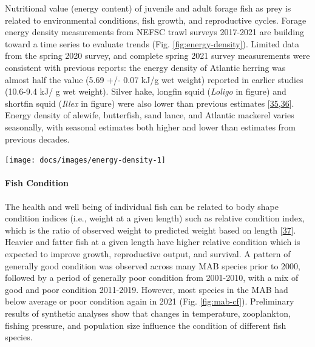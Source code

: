\documentclass[
  10pt,
]{article}
\let\origfigure\figure
\let\endorigfigure\endfigure
\renewenvironment{figure}[1][2] {
    \expandafter\origfigure\expandafter[H]
} {
    \endorigfigure
}
\begin{document}
Nutritional value (energy content) of juvenile and adult forage fish as
prey is related to environmental conditions, fish growth, and
reproductive cycles. Forage energy density measurements from NEFSC trawl
surveys 2017-2021 are building toward a time series to evaluate trends
(Fig. \ref{fig:energy-density}). Limited data from the spring 2020
survey, and complete spring 2021 survey measurements were consistent
with previous reports: the energy density of Atlantic herring was almost
half the value (5.69 +/- 0.07 kJ/g wet weight) reported in earlier
studies (10.6-9.4 kJ/ g wet weight). Silver hake, longfin squid
(\emph{Loligo} in figure) and shortfin squid (\emph{Illex} in figure)
were also lower than previous estimates
{[}\protect\hyperlink{ref-steimle_energy_1985}{35},\protect\hyperlink{ref-lawson_important_1998}{36}{]}.
Energy density of alewife, butterfish, sand lance, and Atlantic mackerel
varies seasonally, with seasonal estimates both higher and lower than
estimates from previous decades.

\begin{figure}

{\centering \texttt{[image: docs/images/energy-density-1]} 

}

\caption{Forage fish energy density mean and standard deviation by season and year, compared with 1980s (solid line; Steimle and Terranove 1985) and 1990s (dashed line; Lawson et al. 1998) values.}\label{fig:energy-density}
\end{figure}

\hypertarget{fish-condition}{%
\paragraph{Fish Condition}\label{fish-condition}}

The health and well being of individual fish can be related to body
shape condition indices (i.e., weight at a given length) such as
relative condition index, which is the ratio of observed weight to
predicted weight based on length
{[}\protect\hyperlink{ref-le_cren_length-weight_1951}{37}{]}. Heavier
and fatter fish at a given length have higher relative condition which
is expected to improve growth, reproductive output, and survival. A
pattern of generally good condition was observed across many MAB species
prior to 2000, followed by a period of generally poor condition from
2001-2010, with a mix of good and poor condition 2011-2019. However,
most species in the MAB had below average or poor condition again in
2021 (Fig. \ref{fig:mab-cf}). Preliminary results of synthetic analyses
show that changes in temperature, zooplankton, fishing pressure, and
population size influence the condition of different fish species.
\end{document}
